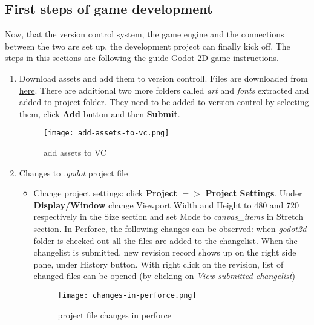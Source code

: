 \subsection{First steps of game development}
Now, that the version control system, the game engine and the connections between the two are set up, the
development project can finally kick off. The steps in this sections are following the guide 
\href{https://docs.godotengine.org/en/stable/getting_started/first_2d_game/index.html}{\color{blue}Godot 2D game instructions}.
\begin{enumerate}
    \item Download assets and add them to version controll. Files are downloaded from 
    \href{https://github.com/godotengine/godot-docs-project-starters/releases/download/latest-4.x/dodge_the_creeps_2d_assets.zip}{\color{blue}here}.
    There are additional two more folders called \textit{art} and \textit{fonts} extracted and added to project folder.
    They need to be added to version control by selecting them, click \textbf{Add} button and then \textbf{Submit}.
    \begin{figure}[H]
        \centering
        \texttt{[image: add-assets-to-vc.png]}
        \caption{add assets to VC}
        \label{fig:add-assets-to-vc}
    \end{figure}
    \item Changes to \textit{.godot} project file
    \begin{itemize}
        \item Change project settings: click \textbf{Project} {$=>$} \textbf{Project Settings}. Under \textbf{Display/Window}
        change Viewport Width and Height to 480 and 720 respectively in the Size section and set Mode to \textit{canvas\_items}
        in Stretch section. In Perforce, the following changes can be observed: when \textit{godot2d} folder is checked out
        all the files are added to the changelist. When the changelist is submitted, new revision record shows up on the 
        right side pane, under History button. With right click on the revision, list of changed files can be opened (by
        clicking on \textit{View submitted changelist}) 
        \begin{figure}[H]
            \centering
            \texttt{[image: changes-in-perforce.png]}
            \setlength{\belowcaptionskip}{-12pt}
            \caption{project file changes in perforce}
            \label{fig:changes-in-perforce}
        \end{figure}

\end{itemize}
\end{enumerate}
